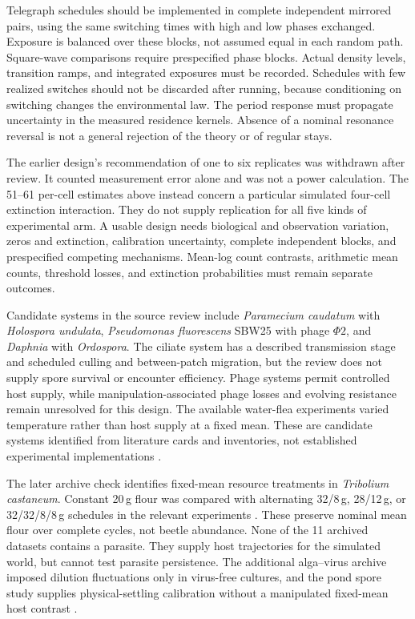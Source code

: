Telegraph schedules should be implemented in complete independent mirrored
pairs, using the same switching times with high and low phases exchanged.
Exposure is balanced over these blocks, not assumed equal in each random
path. Square-wave comparisons require prespecified phase blocks. Actual
density levels, transition ramps, and integrated exposures must be recorded.
Schedules with few realized switches should not be discarded after running,
because conditioning on switching changes the environmental law.
The period response must propagate uncertainty in the measured residence
kernels. Absence of a nominal resonance reversal is not a general rejection
of the theory or of regular stays.

The earlier design's recommendation of one to six replicates was withdrawn
after review. It counted measurement error alone and was not a power
calculation. The 51--61 per-cell estimates above instead concern a
particular simulated four-cell extinction interaction. They do not supply
replication for all five kinds of experimental arm. A usable design needs
biological and observation variation, zeros and extinction, calibration
uncertainty, complete independent blocks, and prespecified competing
mechanisms. Mean-log count contrasts, arithmetic mean counts, threshold
losses, and extinction probabilities must remain separate outcomes.

Candidate systems in the source review include \textit{Paramecium caudatum}
with \textit{Holospora undulata}, \textit{Pseudomonas fluorescens} SBW25
with phage $\Phi2$, and \textit{Daphnia} with \textit{Ordospora}.
The ciliate system has a described transmission stage and scheduled
culling and between-patch migration, but the review does not supply
spore survival or encounter efficiency. Phage systems permit controlled host supply, while
manipulation-associated phage losses and evolving resistance remain
unresolved for this design. The available water-flea experiments varied
temperature rather than host supply at a fixed mean. These are candidate
systems identified from literature cards and inventories, not established
experimental implementations
\citep{duncan2013,harrison2013,krichel2023}.

The later archive check identifies fixed-mean resource treatments in
\textit{Tribolium castaneum}. Constant 20\,g flour was compared with
alternating 32/8\,g, 28/12\,g, or 32/32/8/8\,g schedules in the relevant
experiments \citep{desharnais2023}. These preserve nominal mean
flour over complete cycles, not beetle abundance. None of the 11
archived datasets contains a parasite. They supply host trajectories for
the simulated world, but cannot test parasite persistence. The additional
alga--virus archive imposed dilution fluctuations only in virus-free
cultures, and the pond spore study supplies physical-settling calibration
without a manipulated fixed-mean host contrast
\citep{lepennec2024,tadiri2026}.

